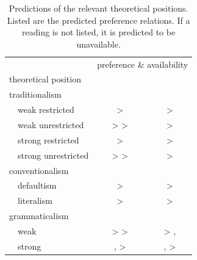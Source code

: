 \documentclass[fleqn,reqno,10pt,draft]{article}
\newcommand{\lit}{\acro{lit}}
\newcommand{\glb}{\acro{glb}}
\newcommand{\loc}{\acro{loc}}
\newcommand{\as}{\acro{as}}
\renewcommand{\es}{\acro{es}}
\begin{document}
\begin{table}[t]
  \centering
  \begin{tabular}{lcc}
    & \multicolumn{2}{c}{preference \& availability}
    \\ \cmidrule(r){2-3}
    theoretical position
    & \as
    & \es
    \\ \midrule
    traditionalism
    \\
    \ \ weak restricted 
    & \lit > \glb 
    & \lit > \glb
    \\
    \ \ weak unrestricted
    & \lit > \glb > \loc 
    & \lit > \glb
    \\
    \ \ strong restricted
    & \glb > \lit 
    & \glb > \lit
    \\
    \ \ strong unrestricted
    & \glb > \loc > \lit 
    & \glb > \lit
    \\
    conventionalism
    \\
    \ \ defaultism
    & \loc >  \lit 
    & \loc >  \lit
    \\
    \ \ literalism
    & \lit >  \loc 
    & \lit >  \loc
    \\
    grammaticalism
    \\
    \ \ weak
    & \loc > \glb > \lit 
    & \glb > \lit, \loc
    \\
    \ \ strong
    & \glb, \loc > \lit 
    & \glb, \loc >  \lit
    \\
  \end{tabular}
  \caption{Predictions of the relevant theoretical positions. Listed
    are the predicted preference relations. If a reading is not
    listed, it is predicted to be unavailable.}
  \label{tab:predictions}
\end{table}
\end{document}

